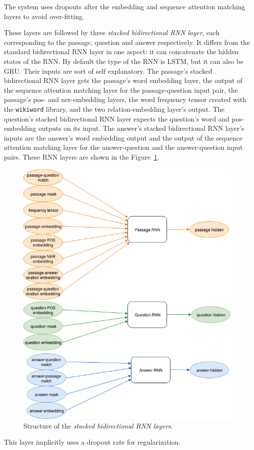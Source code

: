 The system uses dropouts after the embedding and sequence attention matching layers to avoid over-fitting.

These layers are followed by three \textit{stacked bidirectional RNN layer}, each corresponding to the passage, question and answer respectively. It differs from the standard bidirectional RNN layer in one aspect: it can concatenate the hidden states of the RNN. By default the type of the RNN is LSTM, but it can also be GRU. Their inputs are sort of self explanatory. The passage's stacked bidirectional RNN layer gets the passage's word embedding layer, the output of the sequence attention matching layer for the passage-question input pair, the passage's pos- and ner-embedding layers, the word frequency tensor created with the \texttt{wikiword} library, and the two relation-embedding layer's output. The question's stacked bidirectional RNN layer expects the question's word and pos-embedding outputs on its input. The answer's stacked bidirectional RNN layer's inputs are the answer's word embedding output and  the output of the sequence attention matching layer for the answer-question and the answer-question input pairs. These RNN layers are shown in the Figure~\ref{fig:rnn}.
\begin{figure}[h!]
	\centering
	\includegraphics[scale=0.4]{figures/TriAN_rnn.jpg}
	\caption{Structure of the \textit{stacked bidirectional RNN layers}.}
	\label{fig:rnn}
\end{figure}
This layer implicitly uses a dropout rate for regularization.

